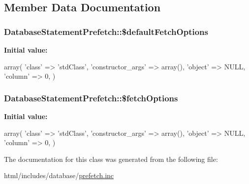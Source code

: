 \subsection{Member Data Documentation}
\hypertarget{classDatabaseStatementPrefetch_af02c3d8eb5a2acf43956d24a4c6ce559}{
\subsubsection[{\$defaultFetchOptions}]{\setlength{\rightskip}{0pt plus 5cm}DatabaseStatementPrefetch::\$defaultFetchOptions}}
\label{classDatabaseStatementPrefetch_af02c3d8eb5a2acf43956d24a4c6ce559}
{\bfseries Initial value:}
\begin{DoxyCode}
 array(
    'class' => 'stdClass',
    'constructor_args' => array(),
    'object' => NULL,
    'column' => 0,
  )
\end{DoxyCode}
\hypertarget{classDatabaseStatementPrefetch_aeaf08234cf0fad652421d02706fc2813}{
\subsubsection[{\$fetchOptions}]{\setlength{\rightskip}{0pt plus 5cm}DatabaseStatementPrefetch::\$fetchOptions}}
\label{classDatabaseStatementPrefetch_aeaf08234cf0fad652421d02706fc2813}
{\bfseries Initial value:}
\begin{DoxyCode}
 array(
    'class' => 'stdClass',
    'constructor_args' => array(),
    'object' => NULL,
    'column' => 0,
  )
\end{DoxyCode}


The documentation for this class was generated from the following file:\begin{DoxyCompactItemize}
\item 
html/includes/database/\hyperlink{prefetch_8inc}{prefetch.inc}\end{DoxyCompactItemize}

